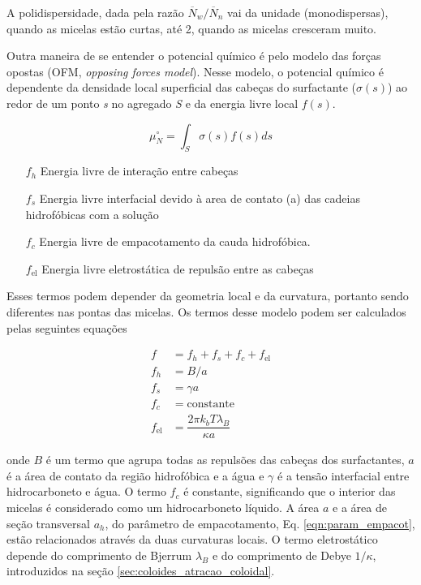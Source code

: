 		A polidispersidade, dada pela razão \(\overline{N}_w / \overline{N}_n\) vai da unidade (monodispersas), quando as micelas estão curtas, até 2, quando as micelas cresceram muito.
		
		Outra maneira de se entender o potencial químico é pelo modelo das forças opostas (OFM, \emph{opposing forces model}). Nesse modelo, o potencial químico é dependente da densidade local superficial das cabeças do surfactante (\(\sigma(s)\)) ao redor de um ponto \emph{s} no agregado \emph{S} e da energia livre local \(f(s)\).
		
		\begin{equation}
		\mu_N^\circ = \int_S \sigma(s) f(s) ds
		\label{eqn:OFM_potencial_quimico}
		\end{equation} 		%
		
		
		
		\begin{itemize}
			\item[\(f_h\)] Energia livre de interação entre cabeças
			\item[\(f_s\)] Energia livre interfacial devido à area de contato (a) das cadeias hidrofóbicas com a solução
			\item[\(f_c\)] Energia livre de empacotamento da cauda hidrofóbica.
			\item[\(f_\mathrm{el}\)] Energia livre eletrostática de repulsão entre as cabeças
		\end{itemize}
		
		Esses termos podem depender da geometria local e da curvatura, portanto sendo diferentes nas pontas das micelas. Os termos desse modelo podem ser calculados pelas seguintes equações
		
		\begin{subequations}
			\begin{align}
				f   &= f_h + f_s + f_c + f_\mathrm{el} \\
				f_h &= B / a     \\
				f_s &= \gamma a  \\
				f_c &= \mathrm{constante}  \\
				f_\mathrm{el} &= \dfrac{2\pi k_bT\lambda_B}{\kappa a}
			\end{align}
			\label{eqn:componentes_OFM}
		\end{subequations}
		
		\noindent onde \(B\) é um termo que agrupa todas as repulsões das cabeças dos surfactantes, \(a\) é a área de contato da região hidrofóbica e a água e \(\gamma\) é a tensão interfacial entre hidrocarboneto e água. O termo \(f_c\) é constante, significando que o interior das micelas é considerado como um hidrocarboneto líquido. A área \(a\) e a área de seção transversal \(a_h\), do parâmetro de empacotamento, Eq. \ref{eqn:param_empacot}, estão relacionados através da duas curvaturas locais. O termo eletrostático depende do comprimento de Bjerrum \(\lambda_B\) e do comprimento de Debye \(1/\kappa\), introduzidos na seção \ref{sec:coloides_atracao_coloidal}.
		
